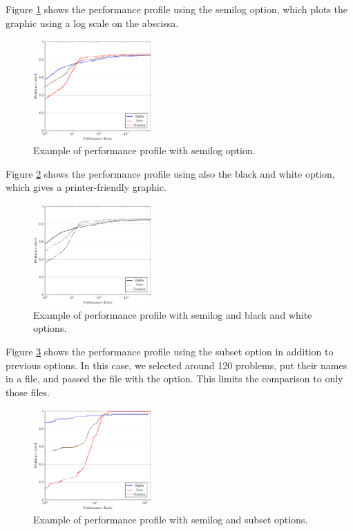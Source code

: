     Figure \ref{fig:example2} shows the performance profile using the semilog
    option, which plots the graphic using a log scale on the abscissa.
    \begin{figure}[!ht]
      \centering
      \includegraphics[width=0.4\textwidth]{plots/abc-semilog.pdf}
      \caption{Example of performance profile with semilog option.}
      \label{fig:example2}
    \end{figure}
    Figure \ref{fig:example3} shows the performance profile using also the black
    and white option, which gives a printer-friendly graphic.
    \begin{figure}[!ht]
      \centering
      \includegraphics[width=0.4\textwidth]{plots/abc-semilog-bw.pdf}
      \caption{Example of performance profile with semilog and black and white
        options.}
      \label{fig:example3}
    \end{figure}
    Figure \ref{fig:example4} shows the performance profile using the subset
    option in addition to previous options. In this case, we selected around 120
    problems, put their names in a file, and passed the file with the option.
    This limits the comparison to only those files.
    \begin{figure}[!ht]
      \centering
      \includegraphics[width=0.4\textwidth]{plots/abc-semilog-hs.pdf}
      \caption{Example of performance profile with semilog and subset options.}
      \label{fig:example4}
    \end{figure}

